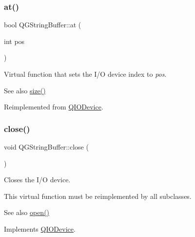 \subsubsection{\texorpdfstring{at()}{at()}\hspace{0.1cm}{\footnotesize\ttfamily [2/2]}}
{\footnotesize\ttfamily bool Q\+G\+String\+Buffer\+::at (\begin{DoxyParamCaption}\item[{int}]{pos }\end{DoxyParamCaption})\hspace{0.3cm}{\ttfamily [virtual]}}

Virtual function that sets the I/O device index to {\itshape pos}. \begin{DoxySeeAlso}{See also}
\mbox{\hyperlink{class_q_g_string_buffer_ad7206e39b7cc87a42717ded03d700cd8}{size()}} 
\end{DoxySeeAlso}


Reimplemented from \mbox{\hyperlink{class_q_i_o_device_a14643fc1c2e05c2addd1ecc03bd98017}{Q\+I\+O\+Device}}.

\mbox{\label{class_q_g_string_buffer_a02458102f8968ef46bfaeab319f8e2fc}} 
\subsubsection{\texorpdfstring{close()}{close()}}
{\footnotesize\ttfamily void Q\+G\+String\+Buffer\+::close (\begin{DoxyParamCaption}{ }\end{DoxyParamCaption})\hspace{0.3cm}{\ttfamily [virtual]}}

Closes the I/O device.

This virtual function must be reimplemented by all subclasses.

\begin{DoxySeeAlso}{See also}
\mbox{\hyperlink{class_q_g_string_buffer_afcecb219691daf1fb5f18f7324fc52b7}{open()}} 
\end{DoxySeeAlso}


Implements \mbox{\hyperlink{class_q_i_o_device_a01a9ddac5d964b5b6a1f10005bf28a4f}{Q\+I\+O\+Device}}.

\mbox{\label{class_q_g_string_buffer_a655d2990426c9a646fc4d14273fb89c0}} 
